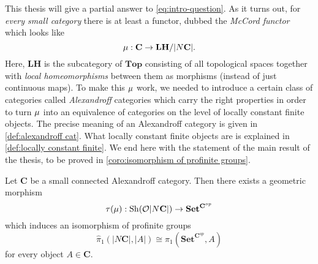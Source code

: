This thesis will give a partial answer to \cref{eq:intro-question}. As it turns out, for \emph{every small category} there is at least a functor, dubbed the \emph{McCord functor} which looks like
\[ \operatorname{\mu} : \mathbf{C} \to \mathbf{LH}/|N\mathbf{C}|. \]
Here, $\mathbf{LH}$ is the subcategory of $\mathbf{Top}$ consisting of all topological spaces together with \emph{local homeomorphisms} between them as morphisms (instead of just continuous maps). To make this $\operatorname{\mu}$ work, we needed to introduce a certain class of categories called \emph{Alexandroff} categories which carry the right properties in order to turn $\operatorname{\mu}$ into an equivalence of categories on the level of locally constant finite objects. The precise meaning of an Alexandroff category is given in \cref{def:alexandroff cat}. What locally constant finite objects are is explained in \cref{def:locally constant finite}.
We end here with the statement of the main result of the thesis, to be proved in \cref{coro:isomorphism of profinite groups}.
\begin{theorem}
Let $\mathbf{C}$ be a small connected Alexandroff category. Then there exists a geometric morphism
\[ \tau(\operatorname{\mu}) : \operatorname{Sh}(\mathcal{O}|N\mathbf{C}|) \to \mathbf{Set}^{\mathbf{C}^{op}} \]
which induces an isomorphism of profinite groups
\[ \widehat{\pi}_1(|N\mathbf{C}|, |A|) \cong \pi_1\left(\mathbf{Set}^{\mathbf{C}^{op}}, A \right) \]
for every object $A \in \mathbf{C}$.
\end{theorem}

